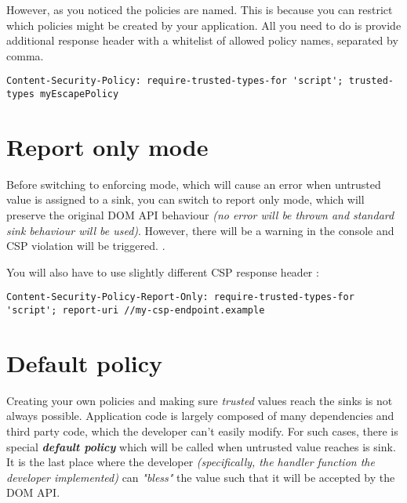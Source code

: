 However, as you noticed the policies are named. This is because you can restrict which policies
might be created by your application. All you need to do is provide additional response header with
a whitelist of allowed policy names, separated by comma.

\bigskip
\begin{lstlisting}[language={}, caption={Restricting policy names}]
  Content-Security-Policy: require-trusted-types-for 'script'; trusted-types myEscapePolicy
\end{lstlisting}

\section{Report only mode}

Before switching to enforcing mode, which will cause an error when untrusted value is assigned to a
sink, you can switch to report only mode, which will preserve the original DOM API behaviour
\emph{(no error will be thrown and standard sink behaviour will be used)}. However, there will be a
warning in the console and CSP violation will be triggered. \cite{tt_intro_csp_violation}.

You will also have to use slightly different CSP response header \cite{trusted_types_into}:

\bigskip
\begin{lstlisting}[language={}, caption={Report only CSP}]
  Content-Security-Policy-Report-Only: require-trusted-types-for 'script'; report-uri //my-csp-endpoint.example
\end{lstlisting}

\section{Default policy}

Creating your own policies and making sure \emph{trusted} values reach the sinks is not always
possible. Application code is largely composed of many dependencies and third party code, which the
developer can't easily modify. For such cases, there is special \emph{\textbf{default policy}} which
will be called when untrusted value reaches is sink. It is the last place where the developer
\emph{(specifically, the handler function the developer implemented)} can \emph{"bless"} the value
such that it will be accepted by the DOM API. \cite{trusted_types_into}

